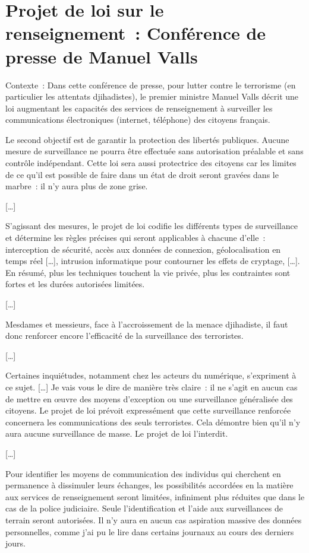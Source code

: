 \section{Projet de loi sur le renseignement : Conférence de presse de Manuel Valls}

\begin{em}
  Contexte : Dans cette conférence de presse, pour lutter contre le terrorisme (en particulier les attentats djihadistes), le premier ministre Manuel Valls décrit une loi augmentant les capacités des services de renseignement à surveiller les communications électroniques (internet, téléphone) des citoyens français.
\end{em}

Le second objectif est de garantir la protection des libertés publiques.
Aucune mesure de surveillance ne pourra être effectuée sans autorisation préalable et sans contrôle indépendant.
Cette loi sera aussi protectrice des citoyens car les limites de ce qu'il est possible de faire dans un état de droit seront gravées dans le marbre : il n'y aura plus de zone grise.

[…]

S'agissant des mesures, le projet de loi codifie les différents types de surveillance et détermine les règles précises qui seront applicables à chacune d'elle : interception de sécurité, accès aux données de connexion, géolocalisation en temps réel […], intrusion informatique pour contourner les effets de cryptage, […].
En résumé, plus les techniques touchent la vie privée, plus les contraintes sont fortes et les durées autorisées limitées.

[…]

Mesdames et messieurs, face à l'accroissement de la menace djihadiste, il faut donc renforcer encore l'efficacité de la surveillance des terroristes.

[…]

Certaines inquiétudes, notamment chez les acteurs du numérique, s'expriment à ce sujet. […]
Je vais vous le dire de manière très claire : il ne s'agit en aucun cas de mettre en œuvre des moyens d'exception ou une surveillance généralisée des citoyens. Le projet de loi prévoit expressément que cette surveillance renforcée concernera les communications des seuls terroristes.
Cela démontre bien qu'il n'y aura aucune surveillance de masse. Le projet de loi l'interdit.

[…]

Pour identifier les moyens de communication des individus qui cherchent en permanence à dissimuler leurs échanges, les possibilités accordées en la matière aux services de renseignement seront limitées, infiniment plus réduites que dans le cas de la police judiciaire.
Seule l'identification et l'aide aux surveillances de terrain seront autorisées. Il n'y aura en aucun cas aspiration massive des données personnelles, comme j'ai pu le lire dans certains journaux au cours des derniers jours.
